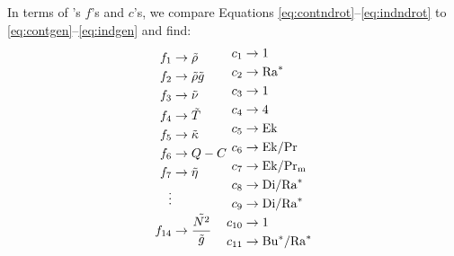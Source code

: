 \documentclass[12pt]{article}
\numberwithin{equation}{section}
\begin{document}
In terms of {\rayleigh}'s $f$'s and $c$'s, we compare Equations \eqref{eq:contndrot}--\eqref{eq:indndrot} to \eqref{eq:contgen}--\eqref{eq:indgen} and find:
\begin{align*}
	\begin{split}
	f_1&\rightarrow \tilde{\rho}\\
	f_2&\rightarrow\tilde{\rho}\tilde{g} \\
	f_3 &\rightarrow \tilde{\nu}\\
	f_4 &\rightarrow \tilde{T}\\
	f_5 &\rightarrow \tilde{\kappa}\\
	f_6 &\rightarrow Q - C\\
	f_7 &\rightarrow \tilde{\eta}\\
	\vdots\\
	f_{14} &\rightarrow \frac{\tilde{N^2}}{\tilde{g}}
\end{split}
\begin{split}
c_1 &\rightarrow 1\\
c_2 &\rightarrow {\rm{Ra}}^*\\
c_3 &\rightarrow 1\\
c_4 &\rightarrow 4\\
c_5 &\rightarrow {\rm{Ek}}\\
c_6 &\rightarrow {\rm{Ek}}/{\rm{Pr}}\\
c_7 &\rightarrow {\rm{Ek}}/{\rm{Pr_m}}\\
c_8 &\rightarrow {\rm{Di}}/{\rm{Ra}}^*\\
c_9 &\rightarrow {\rm{Di}}/{\rm{Ra}}^*\\
c_{10} &\rightarrow 1\\
c_{11} &\rightarrow {\rm{Bu^*}}/{\rm{Ra}}^*
\end{split}
\end{align*}
\end{document}
